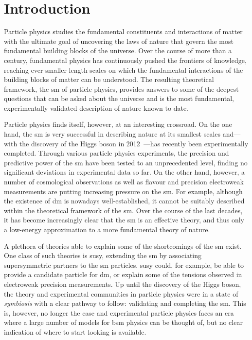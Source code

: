 
\chapter*{Introduction}


Particle physics studies the fundamental constituents and interactions of matter with the ultimate goal of uncovering the laws of nature that govern the most fundamental building blocks of the universe.
Over the course of more than a century, fundamental physics has continuously pushed the frontiers of knowledge, reaching ever-smaller length-scales on which the fundamental interactions of the building blocks of matter can be understood.
The resulting theoretical framework, the \gls{sm} of particle physics, provides answers to some of the deepest questions that can be asked about the universe and is the most fundamental, experimentally validated description of nature known to date. 

Particle physics finds itself, however, at an interesting crossroad. On the one hand, the \gls{sm} is very successful in describing nature at its smallest scales and---with the discovery of the Higgs boson in 2012~\cite{HIGG-2012-27,CMS-HIG-12-028}---has recently been experimentally completed.
Through various particle physics experiments, the precision and predictive power of the \gls{sm} have been tested to an unprecedented level, finding no significant deviations in experimental data so far.
On the other hand, however, a number of cosmological observations as well as flavour and precision electroweak measurements are putting increasing pressure on the \gls{sm}.
For example, although the existence of \gls{dm} is nowadays well-established, it cannot be suitably described within the theoretical framework of the \gls{sm}.
Over the course of the last decades, it has become increasingly clear that the \gls{sm} is an effective theory, and thus only a low-energy approximation to a more fundamental theory of nature.

A plethora of theories able to explain some of the shortcomings of the \gls{sm} exist. One class of such theories is \gls{susy}, extending the \gls{sm} by associating supersymmetric partners to the \gls{sm} particles.
\gls{susy} could, for example, be able to provide a candidate particle for \gls{dm}, or explain some of the tensions observed in electroweak precision measurements.
Up until the discovery of the Higgs boson, the theory and experimental communities in particle physics were in a state of \textit{symbiosis} with a clear pathway to follow: validating and completing the \gls{sm}. This is, however, no longer the case and experimental particle physics faces an era where a large number of models for \gls{bsm} physics can be thought of, but no clear indication of where to start looking is available. 


